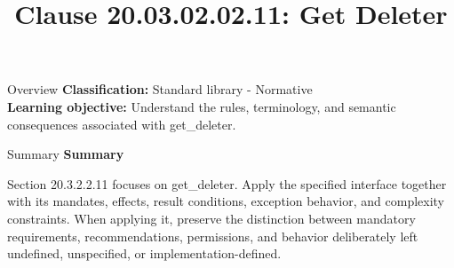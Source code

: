 \documentclass[10pt,letterpaper]{article}
\title{Clause 20.03.02.02.11: Get Deleter}
\author{}
\date{}
\begin{document}
\maketitle
\begin{CornellOverviewBox}{Overview}
\textbf{Classification:} Standard library - Normative\\[2pt]
\textbf{Learning objective:} Understand the rules, terminology, and semantic consequences associated with get\_deleter.
\end{CornellOverviewBox}\begin{CornellSummaryBox}{Summary}
{\sffamily\bfseries\color{Accent} Summary}\par\vspace{3pt}Section 20.3.2.2.11 focuses on get\_deleter. Apply the specified interface together with its mandates, effects, result conditions, exception behavior, and complexity constraints. When applying it, preserve the distinction between mandatory requirements, recommendations, permissions, and behavior deliberately left undefined, unspecified, or implementation-defined.
\end{CornellSummaryBox}
\end{document}
